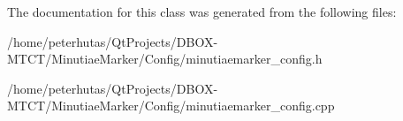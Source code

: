 The documentation for this class was generated from the following files\+:\begin{DoxyCompactItemize}
\item 
/home/peterhutas/\+Qt\+Projects/\+D\+B\+O\+X-\/\+M\+T\+C\+T/\+Minutiae\+Marker/\+Config/minutiaemarker\+\_\+config.\+h\item 
/home/peterhutas/\+Qt\+Projects/\+D\+B\+O\+X-\/\+M\+T\+C\+T/\+Minutiae\+Marker/\+Config/minutiaemarker\+\_\+config.\+cpp\end{DoxyCompactItemize}
